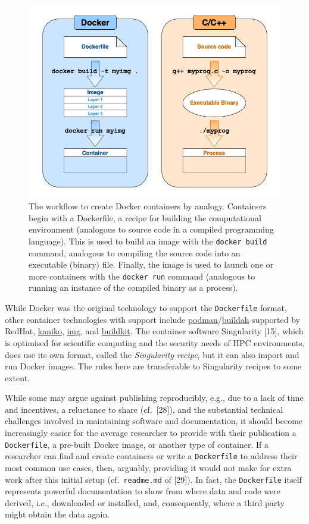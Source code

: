 \documentclass[10pt,letterpaper]{article}
\begin{document}
\begin{figure}[h]
\includegraphics[width=1\linewidth]{container-analogy} \caption{The workflow to create Docker containers by analogy. Containers begin with a Dockerfile, a recipe for building the computational environment (analogous to source code in a compiled programming language). This is used to build an image with the \texttt{docker build} command, analogous to compiling the source code into an executable (binary) file. Finally, the image is used to launch one or more containers with the \texttt{docker run} command (analogous to running an instance of the compiled binary as a process).}\label{fig:container-analogy}
\end{figure}

While Docker was the original technology to support the
\texttt{Dockerfile} format, other container technologies with support
include
\href{https://podman.io/}{podman}/\href{https://github.com/containers/buildah}{buildah}
supported by RedHat,
\href{https://github.com/GoogleContainerTools/kaniko}{kaniko},
\href{https://github.com/genuinetools/img}{img}, and
\href{https://github.com/moby/buildkit}{buildkit}. The container
software Singularity {[}15{]}, which is optimised for scientific
computing and the security needs of HPC environments, does use its own
format, called the \emph{Singularity recipe}, but it can also import and
run Docker images. The rules here are transferable to Singularity
recipes to some extent.

While some may argue against publishing reproducibly, e.g., due to a
lack of time and incentives, a reluctance to share (cf.~{[}28{]}), and
the substantial technical challenges involved in maintaining software
and documentation, it should become increasingly easier for the average
researcher to provide with their publication a \texttt{Dockerfile}, a
pre-built Docker image, or another type of container. If a researcher
can find and create containers or write a \texttt{Dockerfile} to address
their most common use cases, then, arguably, providing it would not make
for extra work after this initial setup (cf.~\texttt{readme.md} of
{[}29{]}). In fact, the \texttt{Dockerfile} itself represents powerful
documentation to show from where data and code were derived, i.e.,
downloaded or installed, and, consequently, where a third party might
obtain the data again.
\end{document}
